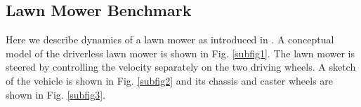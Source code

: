 \subsection{Lawn Mower Benchmark}
Here we describe dynamics of a lawn mower as introduced in \cite{foldager2017development}. A conceptual model of the driverless lawn mower is shown in Fig. \ref{subfig1}. The lawn mower is steered by controlling the velocity separately on the two driving wheels. A sketch of the vehicle is shown in Fig. \ref{subfig2} and its chassis and caster wheels are shown in Fig. \ref{subfig3}.
\begin{figure}[hpt]
\centering
{}

\end{figure}
